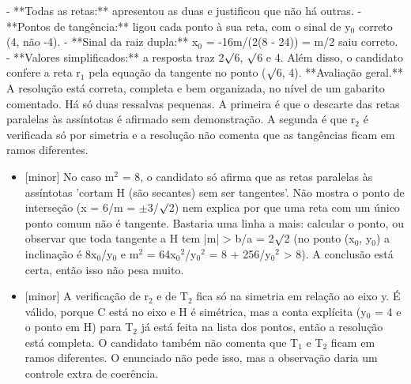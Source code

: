 \documentclass{article}%
\begin{document}
{-} **Todas as retas:** apresentou as duas e justificou que não há outras.\newline%
{-} **Pontos de tangência:** ligou cada ponto à sua reta, com o sinal de y$_{0}$ correto (4, não -4).\newline%
{-} **Sinal da raiz dupla:** x$_{0}$ = -16m/(2(8 - 24)) = m/2 saiu correto.\newline%
{-} **Valores simplificados:** a resposta traz 2$\surd$6, $\surd$6 e 4.\newline%
\newline%
Além disso, o candidato confere a reta r$_{1}$ pela equação da tangente no ponto ($\surd$6, 4).\newline%
\newline%
**Avaliação geral.** A resolução está correta, completa e bem organizada, no nível de um gabarito comentado. Há só duas ressalvas pequenas. A primeira é que o descarte das retas paralelas às assíntotas é afirmado sem demonstração. A segunda é que r$_{2}$ é verificada só por simetria e a resolução não comenta que as tangências ficam em ramos diferentes.%
\begin{itemize}%
\item%
{[}minor{]} No caso m$^2$ = 8, o candidato só afirma que as retas paralelas às assíntotas 'cortam H (são secantes) sem ser tangentes'. Não mostra o ponto de interseção (x = 6/m = $\pm$3/$\surd$2) nem explica por que uma reta com um único ponto comum não é tangente. Bastaria uma linha a mais: calcular o ponto, ou observar que toda tangente a H tem |m| > b/a = 2$\surd$2 (no ponto (x$_{0}$, y$_{0}$) a inclinação é 8x$_{0}$/y$_{0}$ e m$^2$ = 64x$_{0}$$^2$/y$_{0}$$^2$ = 8 + 256/y$_{0}$$^2$ > 8). A conclusão está certa, então isso não pesa muito.%
\item%
{[}minor{]} A verificação de r$_{2}$ e de T$_{2}$ fica só na simetria em relação ao eixo y. É válido, porque C está no eixo e H é simétrica, mas a conta explícita (y$_{0}$ = 4 e o ponto em H) para T$_{2}$ já está feita na lista dos pontos, então a resolução está completa. O candidato também não comenta que T$_{1}$ e T$_{2}$ ficam em ramos diferentes. O enunciado não pede isso, mas a observação daria um controle extra de coerência.%
\end{itemize}%
\end{document}
